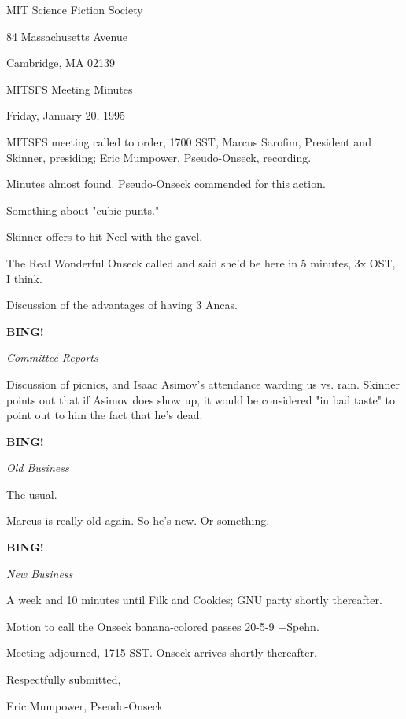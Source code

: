 \documentclass[12pt]{article}
\newcommand{\bing}{{\bf BING!} }
\newcommand{\goto}[1]{\bing \vskip 12pt \centerline{{\em{#1}}}}
\begin{document}
\begin{center}

MIT Science Fiction Society 

84 Massachusetts Avenue

Cambridge, MA 02139

\vspace{12pt}

MITSFS Meeting Minutes 

Friday, January 20, 1995

\end{center}
 
\vspace{18pt}

\setlength{\parskip}{6pt}

\noindent
MITSFS meeting called to order, 1700 SST,
Marcus Sarofim, President and Skinner, presiding; Eric Mumpower, Pseudo-Onseck, recording.

Minutes almost found. Pseudo-Onseck commended for this action.

Something about "cubic punts."

Skinner offers to hit Neel with the gavel.

The Real Wonderful Onseck called and said she'd be here in 5 minutes, 3x OST, I think.

Discussion of the advantages of having 3 Ancas.

\goto{Committee Reports}

Discussion of picnics, and Isaac Asimov's attendance warding us vs. rain. Skinner points out that if Asimov does show up, it would be considered "in bad taste" to point out to him the fact that he's dead.

\goto{Old Business}

The usual.

Marcus is really old again. So he's new. Or something.

\goto{New Business}

A week and 10 minutes until Filk and Cookies; GNU party shortly thereafter.

Motion to call the Onseck banana-colored passes 20-5-9 +Spehn.

\vspace{12pt}

\noindent
Meeting adjourned, 1715 SST. Onseck arrives shortly thereafter.

\vspace{18pt}

\centerline{Respectfully submitted,}
\centerline{Eric Mumpower, Pseudo-Onseck}
\end{document}
